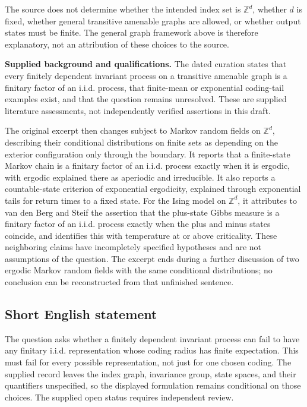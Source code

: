 \documentclass[11pt]{article}
\begin{document}
The source does not determine whether the intended index set is \(\mathbb Z^d\), whether \(d\) is fixed, whether general transitive amenable graphs are allowed, or whether output states must be finite. The general graph framework above is therefore explanatory, not an attribution of these choices to the source.

\textbf{Supplied background and qualifications.} The dated curation states that every finitely dependent invariant process on a transitive amenable graph is a finitary factor of an i.i.d. process, that finite-mean or exponential coding-tail examples exist, and that the question remains unresolved. These are supplied literature assessments, not independently verified assertions in this draft.

The original excerpt then changes subject to Markov random fields on \(\mathbb Z^d\), describing their conditional distributions on finite sets as depending on the exterior configuration only through the boundary. It reports that a finite-state Markov chain is a finitary factor of an i.i.d. process exactly when it is ergodic, with ergodic explained there as aperiodic and irreducible. It also reports a countable-state criterion of exponential ergodicity, explained through exponential tails for return times to a fixed state. For the Ising model on \(\mathbb Z^d\), it attributes to van den Berg and Steif the assertion that the plus-state Gibbs measure is a finitary factor of an i.i.d. process exactly when the plus and minus states coincide, and identifies this with temperature at or above criticality. These neighboring claims have incompletely specified hypotheses and are not assumptions of the question. The excerpt ends during a further discussion of two ergodic Markov random fields with the same conditional distributions; no conclusion can be reconstructed from that unfinished sentence.
\subsection{Short English statement}
The question asks whether a finitely dependent invariant process can fail to have any finitary i.i.d. representation whose coding radius has finite expectation. This must fail for every possible representation, not just for one chosen coding. The supplied record leaves the index graph, invariance group, state spaces, and their quantifiers unspecified, so the displayed formulation remains conditional on those choices. The supplied open status requires independent review.
\end{document}
